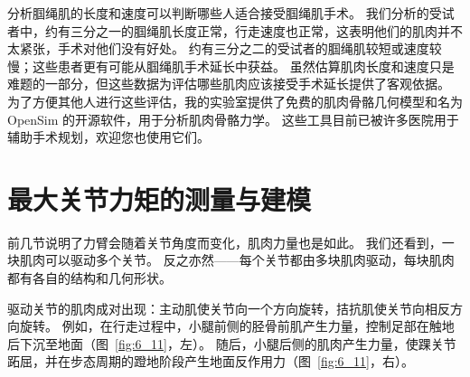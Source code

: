 分析腘绳肌的长度和速度可以判断哪些人适合接受腘绳肌手术。
我们分析的受试者中，约有三分之一的腘绳肌长度正常，行走速度也正常，这表明他们的肌肉并不太紧张，手术对他们没有好处。
约有三分之二的受试者的腘绳肌较短或速度较慢；这些患者更有可能从腘绳肌手术延长中获益。
虽然估算肌肉长度和速度只是难题的一部分，但这些数据为评估哪些肌肉应该接受手术延长提供了客观依据。
为了方便其他人进行这些评估，我的实验室提供了免费的肌肉骨骼几何模型和名为 OpenSim 的开源软件，用于分析肌肉骨骼力学。
这些工具目前已被许多医院用于辅助手术规划，欢迎您也使用它们。



\section{最大关节力矩的测量与建模}

前几节说明了力臂会随着关节角度而变化，肌肉力量也是如此。
我们还看到，一块肌肉可以驱动多个关节。
反之亦然——每个关节都由多块肌肉驱动，每块肌肉都有各自的结构和几何形状。


驱动关节的肌肉成对出现：主动肌使关节向一个方向旋转，拮抗肌使关节向相反方向旋转。
例如，在行走过程中，小腿前侧的胫骨前肌产生力量，控制足部在触地后下沉至地面（图~\ref{fig:6_11}，左）。
随后，小腿后侧的肌肉产生力量，使踝关节跖屈，并在步态周期的蹬地阶段产生地面反作用力（图~\ref{fig:6_11}，右）。


